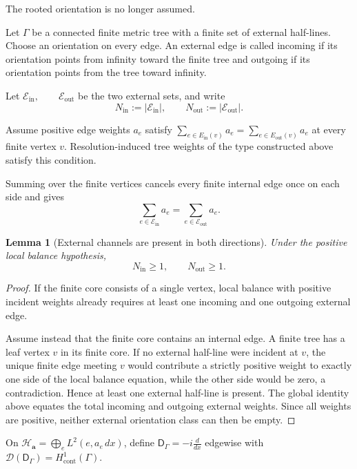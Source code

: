 \documentclass[11pt]{article}
\theoremstyle{plain}
\newtheorem{lemma}[theorem]{Lemma}
\theoremstyle{definition}
\begin{document}
The rooted orientation is no longer assumed.

Let \(\Gamma\) be a connected finite metric tree with a finite set of external half-lines.
Choose an orientation on every edge. An external edge is called incoming if
its orientation points from infinity toward the finite tree and outgoing if
its orientation points from the tree toward infinity.

Let \(\mathcal E_{\mathrm{in}}, \qquad \mathcal E_{\mathrm{out}}\) be the two external sets, and write
\[
  N_{\mathrm{in}}
  :=
  |\mathcal E_{\mathrm{in}}|,
  \qquad
  N_{\mathrm{out}}
  :=
  |\mathcal E_{\mathrm{out}}|.
\]

Assume positive edge weights \(a_e\) satisfy \(\sum_{e\in E_{\mathrm{in}}(v)}a_e = \sum_{e\in E_{\mathrm{out}}(v)}a_e\) at every finite vertex \(v\). Resolution-induced tree weights of the type
constructed above satisfy this condition.

Summing over the finite vertices cancels every finite internal edge once on
each side and gives
\[
  \sum_{e\in\mathcal E_{\mathrm{in}}}a_e
  =
  \sum_{e\in\mathcal E_{\mathrm{out}}}a_e.
\]

\begin{lemma}[External channels are present in both directions]
\label{lem:trees-external-directions}
Under the positive local balance hypothesis,
\[
  N_{\mathrm{in}}\geq1,
  \qquad
  N_{\mathrm{out}}\geq1.
\]
\end{lemma}

\begin{proof}
If the finite core consists of a single vertex, local balance with positive
incident weights already requires at least one incoming and one outgoing
external edge.

Assume instead that the finite core contains an internal edge. A finite tree
has a leaf vertex \(v\) in its finite core. If no external half-line were
incident at \(v\), the unique finite edge meeting \(v\) would contribute a
strictly positive weight to exactly one side of the local balance equation,
while the other side would be zero, a contradiction. Hence at least one
external half-line is present. The global identity above equates the total
incoming and outgoing external weights. Since all weights are positive,
neither external orientation class can then be empty.
\end{proof}

On
\(\mathcal H_{\mathbf a} = \bigoplus_eL^2(e,a_e\,dx)\),
define \(\mathsf D_\Gamma = -i\frac{d}{dx}\) edgewise with
\(\mathcal D(\mathsf D_\Gamma) = H^1_{\mathrm{cont}}(\Gamma)\).
\end{document}
